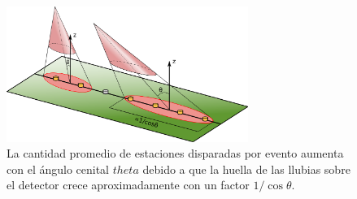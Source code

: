 	\begin{figure}[ht!]
		\begin{center}
			\includegraphics[width=0.7\textwidth]{fig/resultadosAuger/huellas}
			\caption{La cantidad promedio de estaciones disparadas por evento aumenta con el ángulo cenital $theta$ debido a que la huella de las llubias sobre el detector crece aproximadamente con un factor $1/\cos\theta$.}
			\label{fig:effDG_th_sktch}
		\end{center}
	\end{figure}
	
